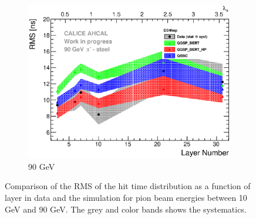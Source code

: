 \begin{figure}[htbp!]
\begin{subfigure}[t]{0.49\textwidth}
    \centering
    \includegraphics[width=1\textwidth]{../Thesis_Plots/Timing/Pions/Plots/ComparisonToSim/RMS_Depth_90GeV_DD4hep.eps}
    \caption{90 GeV}\label{fig:Depth_RMS_SimData_90GeV_DD4hep}
  \end{subfigure}
  \caption{Comparison of the RMS of the hit time distribution as a function of layer in data and the \ddhep simulation for pion beam energies between 10 GeV and 90 GeV. The grey and color bands shows the systematics.}
  \label{fig:Depth_RMS_SimData_Comparison_DD4hep}
\end{figure}
